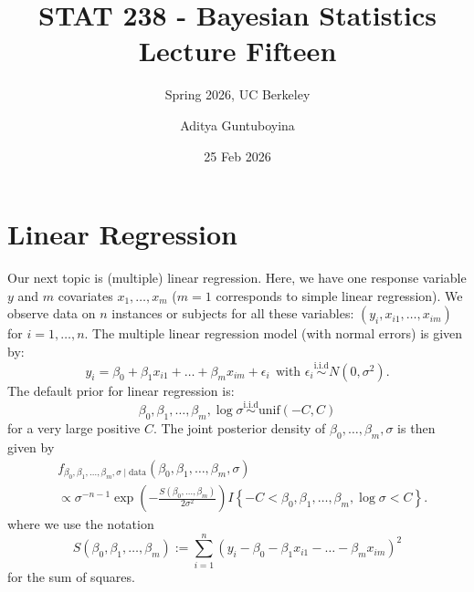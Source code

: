 \documentclass{scrartcl}
\begin{document}
\title{STAT 238 - Bayesian Statistics  \\
  Lecture Fifteen} 
\subtitle{Spring 2026, UC Berkeley}

\author{Aditya Guntuboyina}


\date{25 Feb 2026}

\maketitle

\section{Linear Regression}

Our next topic is (multiple) linear regression. Here, we have one
response variable $y$ and 
$m$ covariates $x_1, \dots, x_m$  ($m = 1$ corresponds to simple linear
regression). We observe data on $n$ instances or subjects for all
these variables: $(y_i, x_{i1}, \dots, x_{im})$ for $i = 1, \dots,
n$. The multiple linear regression model (with normal errors) is given
by: 
\begin{equation}\label{lm}
  y_i = \beta_0 + \beta_1 x_{i1} + \dots + \beta_m x_{im} + \epsilon_i
~~  \text{with $\epsilon_i \overset{\text{i.i.d}}{\sim} N(0, \sigma^2)$}. 
\end{equation}
The default prior for linear regression is: 
\begin{equation*}
  \beta_0, \beta_1, \dots, \beta_m, \log \sigma
  \overset{\text{i.i.d}}{\sim} \text{unif}(-C, C)
\end{equation*}
for a very large positive $C$. The joint posterior density of
$\beta_0, \dots, \beta_m, \sigma$ is then given by
\begin{align*}
&  f_{\beta_0, \beta_1, \dots, \beta_m, \sigma \mid \text{data}}(\beta_0, \beta_1,
  \dots, \beta_m,
  \sigma) \\ &\propto  \sigma^{-n-1} \exp 
                                        \left(-\frac{S(\beta_0, \dots,
               \beta_m)}{2 \sigma^2}
    \right) I \left\{-C < \beta_0,
    \beta_1, \dots, \beta_m, \log \sigma < C \right\}. 
\end{align*}
where we use the notation
\begin{equation*}
  S(\beta_0, \beta_1, \dots, \beta_m)  := \sum_{i=1}^n (y_i - \beta_0 - \beta_1
      x_{i1} - \dots - \beta_m x_{im})^2
\end{equation*}
for the sum of squares. 
\end{document}
